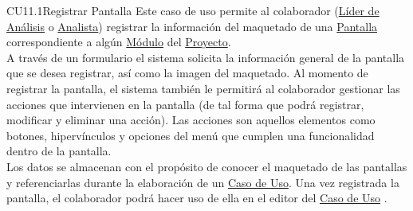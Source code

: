 	\begin{UseCase}{CU11.1}{Registrar Pantalla}{
		Este caso de uso permite al colaborador (\hyperlink{jefe}{Líder de Análisis} o \hyperlink{analista}{Analista}) registrar la información del maquetado de una \hyperlink{pantalla}{Pantalla} correspondiente a algún \hyperlink{moduloEntidad}{Módulo} del \hyperlink{proyectoEntidad}{Proyecto}.\\
		
		A través de un formulario el sistema solicita la información general de la pantalla que se desea registrar, así como la imagen del maquetado. Al momento de registrar la pantalla, el sistema también le permitirá al colaborador gestionar las acciones que intervienen en la pantalla (de tal forma que podrá registrar, modificar y eliminar una acción). Las acciones son aquellos elementos como botones, hipervínculos y opciones del menú que cumplen una funcionalidad dentro de la pantalla. \\
		
		Los datos se almacenan con el propósito de conocer el maquetado de las pantallas y referenciarlas durante la elaboración de un \hyperlink{casoUso}{Caso de Uso}. Una vez registrada la pantalla, el colaborador podrá hacer uso de ella en el editor del \hyperlink{casoUso}{Caso de Uso} .
	}
		

\end{UseCase}

